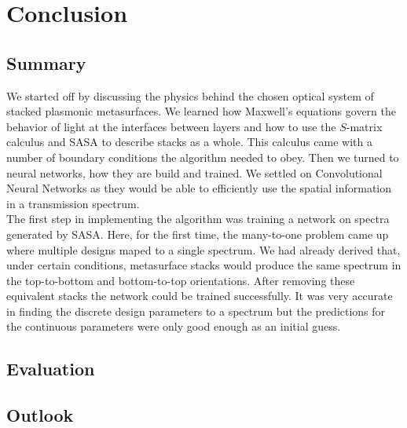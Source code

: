 \section{Conclusion} \label{sec:conclusion}

\subsection{Summary}
We started off by discussing the physics behind the chosen optical system of stacked plasmonic metasurfaces. We learned how Maxwell's equations govern the behavior of light at the interfaces between layers and how to use the $S$-matrix calculus and SASA to describe stacks as a whole. This calculus came with a number of boundary conditions the algorithm needed to obey. Then we turned to neural networks, how they are build and trained. We settled on Convolutional Neural Networks as they would be able to efficiently use the spatial information in a transmission spectrum.
\\

\indent
The first step in implementing the algorithm was training a network on spectra generated by SASA. Here, for the first time, the many-to-one problem came up where multiple designs maped to a single spectrum. We had already derived that, under certain conditions, metasurface stacks would produce the same spectrum in the top-to-bottom and bottom-to-top orientations. After removing these equivalent stacks the network could be trained successfully. It was very accurate in finding the discrete design parameters to a spectrum but the predictions for the continuous parameters were only good enough as an initial guess.
\subsection{Evaluation}

\subsection{Outlook}